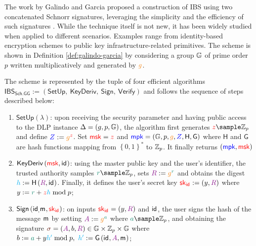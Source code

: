 \documentclass[version=submission, floatrow]{iacrcc}
\begin{document}
The work by Galindo and Garcia proposed a construction of IBS using two concatenated Schnorr signatures, leveraging the simplicity and the efficiency of such signatures \cite{Galindo2009}. While the technique itself is not new, it has been widely studied when applied to different scenarios. Examples range from identity-based encryption schemes to public key infrastructure-related primitives. The scheme is shown in Definition \ref{def:galindo-garcia} by considering a group $\mathbb{G}$ of prime order $p$ written multiplicatively and generated by $\GeneratorSchnorr$.
\begin{definition}\label{def:galindo-garcia}
  The scheme is represented by the tuple of four efficient algorithms $\mathsf{IBS}_{\mathsf{Sch.GG}} := \left(\mathsf{SetUp},\ \mathsf{KeyDeriv},\ \mathsf{Sign},\ \mathsf{Verify}\right)$ and follows the sequence of steps described below:
  \begin{enumerate}[label={\emph{\roman*}})]
    \item $\mathsf{SetUp}\left(\lambda\right)$: upon receiving the security parameter and having public access to the DLP instance $\Delta = \left(g, p, \mathbb{G}\right)$, the algorithm first generates $\PrivKey{z} \sample \Zp$ and define $\PubKey{Z} := \GeneratorSchnorr^{\PrivKey{z}}$. Set $\textcolor{red}{\mathsf{msk}} = \textcolor{red}{z}$ and $\mpk = \left(\Group, p, \GeneratorSchnorr, \PubKey{Z}, \mathsf{H}, \mathsf{G}\right)$ where $\mathsf{H}$ and $\mathsf{G}$ are hash functions mapping from $\left\{0,1\right\}^{*}$ to $\mathbb{Z}_{p}$. It finally returns $\left(\textcolor{blue}{\mathsf{mpk}}, \textcolor{red}{\mathsf{msk}}\right)$

    \item $\mathsf{KeyDeriv}\left(\textcolor{red}{\mathsf{msk}}, \mathsf{id}_{}\right)$: using the master public key and the user's identifier, the trusted authority samples $\Nonce{r} \sample \Zp$, sets $\Commitment{R} := \GeneratorSchnorr^{\Nonce{r}}$ and obtains the digest $\Digest{h} := \mathsf{H}\left(\Commitment{R},\id{}\right)$. Finally, it defines the user's secret key $\PrivKey{\sk_{\id{}}} := \left(y, \Commitment{R}\right)$ where $y := \Nonce{r} + \PrivKey{z}\Digest{h}\bmod{p}$;

    \item $\mathsf{Sign}\left(\mathsf{id}_{,} \mathsf{m}_{}, \textcolor{red}{\mathsf{sk}_{\mathsf{id}_{}}}\right)$: on inputs $\PrivKey{\sk_{\id{}}} = \left(y, \Commitment{R}\right)$ and $\mathsf{id}_{}$, the user signs the hash of the message $\mathsf{m}_{}$ by setting $\Commitment{A} := \GeneratorSchnorr^{\Nonce{a}}$ where $\Nonce{a} \sample \Zp$, and obtaining the signature $\Signature{} = \left(\Commitment{A}, b, \Commitment{R}\right) \in \Group \times \Zp \times \Group$ where $b := \Nonce{a} + y\Digest{h'} \bmod{p},\ \Digest{h'} := \mathsf{G}\left(\id{}, \Commitment{A}, \msg{}\right)$;


\end{enumerate}
\end{definition}
\end{document}
